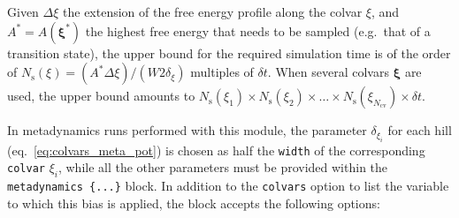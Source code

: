 Given $\Delta\xi$ the extension of the free energy profile along the
colvar $\xi$, and $A^{*}=A(\bm{\xi}^{*})$ the highest free energy that
needs to be sampled (e.g.~that of a transition state), the upper bound
for the required simulation time is of the order of
$N_{\mathrm{s}}(\xi) = (A^{*}\Delta\xi)/(W2\delta_{\xi})$ multiples of
$\delta{}t$.  When several colvars $\bm{\xi}$ are used, the upper
bound amounts to $N_{\mathrm{s}}(\xi_{1}) \times
N_{\mathrm{s}}(\xi_{2}) \times \ldots \times
N_{\mathrm{s}}(\xi_{N_{\mathrm{cv}}}) \times \delta{}t$.

In metadynamics runs performed with this module, the parameter
$\delta_{\xi_{i}}$ for each hill (eq.~\ref{eq:colvars_meta_pot}) is
chosen as half the \texttt{width} of the corresponding \texttt{colvar}
$\xi_{i}$, while all the other parameters must be provided within the
\texttt{metadynamics~\{...\}} block.  In addition to the
\texttt{colvars} option to list the variable to which this bias is
applied, the block accepts the following options:

